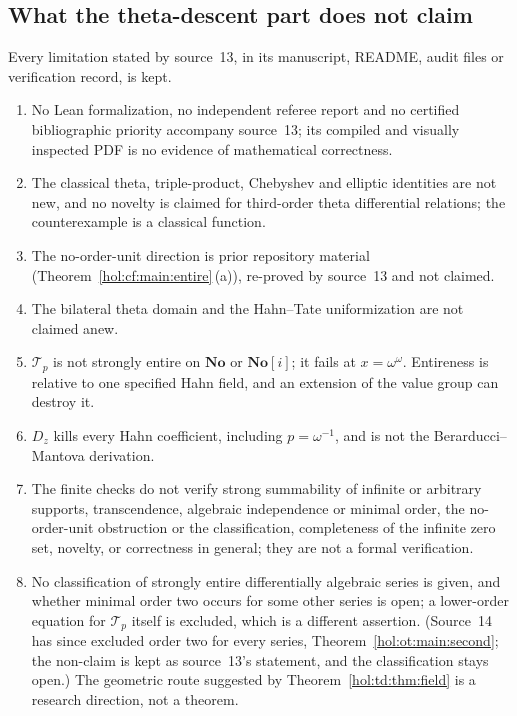 \documentclass[11pt]{article}
\numberwithin{equation}{section}
\theoremstyle{definition}
\theoremstyle{remark}
\newcommand{\No}{\mathbf{No}}
\begin{document}
\subsection{What the theta-descent part does not claim}
\label{hol:td:sub:nonclaims}

Every limitation stated by source~13, in its manuscript, README, audit files
or verification record, is kept.
\begin{enumerate}[label=\textup{(T\arabic*)}]
\item No Lean formalization, no independent referee report and no certified
bibliographic priority accompany source~13; its compiled and visually
inspected PDF is no evidence of mathematical correctness.
\item The classical theta, triple-product, Chebyshev and elliptic identities
are not new, and no novelty is claimed for third-order theta differential
relations; the counterexample is a classical function.
\item The no-order-unit direction is prior repository material
(Theorem~\ref{hol:cf:main:entire}\,(a)), re-proved by source~13 and not
claimed.
\item The bilateral theta domain and the Hahn--Tate uniformization are not
claimed anew.
\item $\mathcal T_p$ is not strongly entire on $\No$ or $\No[i]$; it fails at
$x=\omega^\omega$. Entireness is relative to one specified Hahn field, and an
extension of the value group can destroy it.
\item $D_z$ kills every Hahn coefficient, including $p=\omega^{-1}$, and is
not the Berarducci--Mantova derivation.
\item The finite checks do not verify strong summability of infinite or
arbitrary supports, transcendence, algebraic independence or minimal order,
the no-order-unit obstruction or the classification, completeness of the
infinite zero set, novelty, or correctness in general; they are not a formal
verification.
\item No classification of strongly entire differentially algebraic series is
given, and whether minimal order two occurs for some other series is open; a
lower-order equation for $\mathcal T_p$ itself is excluded, which is a
different assertion. (Source~14 has since excluded order two for every series,
Theorem~\ref{hol:ot:main:second}; the non-claim is kept as source~13's
statement, and the classification stays open.) The geometric route suggested by
Theorem~\ref{hol:td:thm:field} is a research direction, not a theorem.

\end{enumerate}
\end{document}
